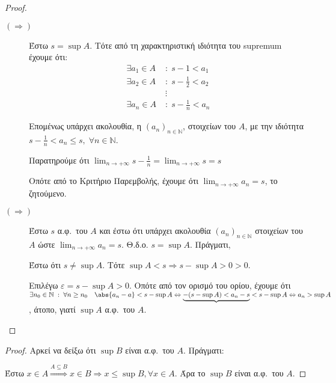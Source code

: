 \documentclass[main.tex]{subfiles}
\begin{document}
\begin{proof}
\item {}
  \begin{description}
    \item [$ (\Rightarrow) $]
      Έστω $ s = \sup A $. Τότε από τη χαρακτηριστική ιδιότητα του supremum έχουμε ότι:
      \begin{align*}
        \exists a_{1} \in A \; &: \; s - 1 < a_{1} \\
        \exists a_{2} \in A \; &: \; s - \frac{1}{2}  < a_{2} \\
                               &\vdots \\
        \exists a_{n} \in A \; &: \; s - \frac{1}{n}  < a_{n} 
      \end{align*} 

      Επομένως υπάρχει ακολουθία, η $ (a_{n})_{n \in \mathbb{N}} $, στοιχείων του $A$, 
      με την ιδιότητα $ s - \frac{1}{n} < a_{n} \leq s, \; \forall n \in \mathbb{N}$. 

      Παρατηρούμε ότι $ \lim_{n \to +\infty} s- \frac{1}{n} = \lim_{n \to +\infty} s = s $ 

      Οπότε από το Κριτήριο Παρεμβολής, έχουμε ότι $ \lim_{n \to +\infty} a_{n}= s $, 
      το ζητούμενο.

    \item [$ (\Rightarrow) $]
      Έστω $ s $ α.φ.\ του $A$ και έστω ότι υπάρχει ακολουθία $ (a_{n})_{n \in \mathbb{N}} $ 
      στοιχείων του $A$ ώστε $ \lim_{n \to +\infty} a_{n}= s$. Θ.δ.ο. $ s = \sup A $. 
      Πράγματι, 

      Έστω ότι $ s \neq \sup A $. Τότε $ \sup A < s \Rightarrow s - \sup A > 0 > 0 $. 

      Επιλέγω $ \varepsilon = s - \sup A >0 $. Οπότε από τον ορισμό του ορίου, έχουμε ότι 
      $ \exists n_{0} \in \mathbb{N} \; : \; \forall n \geq n_{0} \quad \abs{a_{n} - a} < 
      s - \sup A \Leftrightarrow \underbrace{-(s - \sup A) < a_{n} - s} < s - \sup A 
      \Leftrightarrow a_{n} > \sup A$, άτοπο, γιατί $ \sup A $ α.φ.\ του $A$.
  \end{description}
\end{proof}




\begin{proof}
\item {}
  Αρκεί να δείξω ότι $ \sup B $ είναι α.φ.\ του $A$. Πράγματι:

  Έστω $ x \in A \overset{A \subseteq B}{\Rightarrow } x \in B \Rightarrow 
  x \leq \sup B, \forall x \in A$. Άρα το $ \sup B $ είναι α.φ.\ του $A$.
\end{proof}
\end{document}
